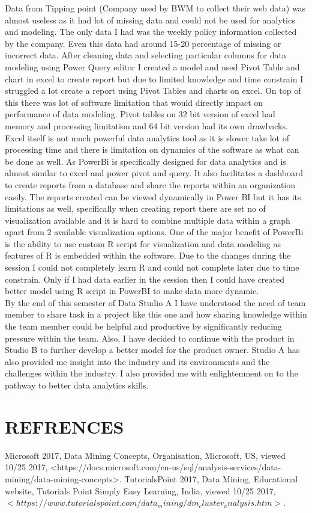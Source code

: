 \documentclass{article}
\begin{document}
Data from Tipping point (Company used by BWM to collect their web data) was almost useless as it had lot of missing data and could not be used for analytics and modeling. The only data I had was the weekly policy information collected by the company. Even this data had around 15-20 percentage of missing or incorrect data. After cleaning data and selecting particular columns for data modeling using Power Query editor I created a model and used Pivot Table and chart in excel to create report but due to limited knowledge and time constrain I struggled a lot create a report using Pivot Tables and charts on excel. On top of this there was lot of software limitation that would directly impact on performance of data modeling. Pivot tables on 32 bit version of excel had memory and processing limitation and 64 bit version had its own drawbacks. Excel itself is not much powerful data analytics tool as it is slower take lot of processing time and there is limitation on dynamics of the software as what can be done as well. As PowerBi is specifically designed for data analytics and is almost similar to excel and power pivot and query. It also facilitates a dashboard to create reports from a database and share the reports within an organization easily. The reports created can be viewed dynamically in Power BI but it has its limitations as well, specifically when creating report there are set no of visualization available and it is hard to combine multiple data within a graph apart from 2 available visualization options. One of the major benefit of PowerBi is the ability to use custom R script for visualization and data modeling as features of R is embedded within the software. Due to the changes during the session I could not completely learn R and could not complete later due to time constrain. Only if I had data earlier in the session then I could have created better model using R script in PowerBI to make data more dynamic.\\

By the end of this semester of Data Studio A I have understood the need of team member to share task in a project like this one and how sharing knowledge within the team member could be helpful and productive by significantly reducing pressure within the team. Also, I have decided to continue with the product in Studio B to further develop a better model for the product owner. Studio A has also provided me insight into the industry and its environments and the challenges within the industry. I also provided me with enlightenment on to the pathway to better data analytics skills.\pagebreak

\section{REFRENCES}\label{refrences}

Microsoft 2017, Data Mining Concepts, Organisation, Microsoft, US, viewed 10/25 2017, <https://docs.microsoft.com/en-us/sql/analysis-services/data-mining/data-mining-concepts>.\linebreak\linebreak
TutorialsPoint 2017, Data Mining, Educational website, Tutorials Point Simply Easy Learning, India, viewed 10/25 2017, $<https://www.tutorialspoint.com/data_mining/dm_cluster_analysis.htm>.$
\end{document}
